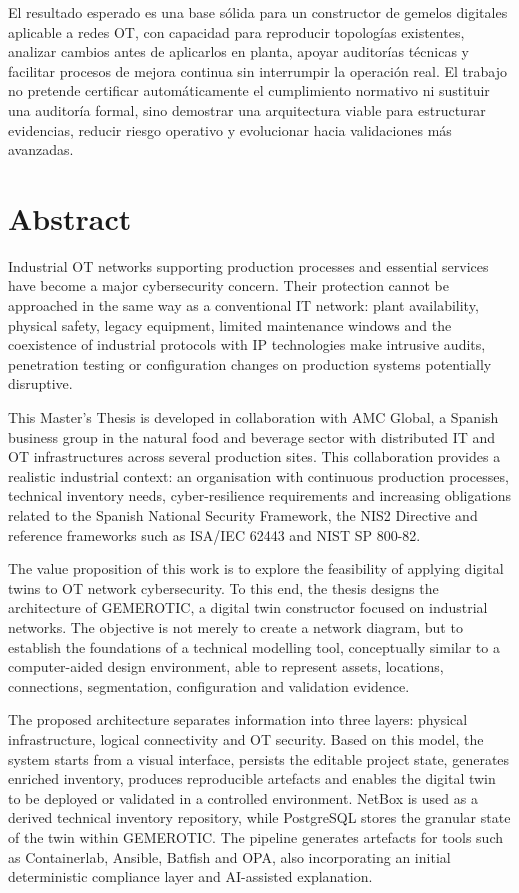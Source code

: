 El resultado esperado es una base sólida para un constructor de gemelos digitales aplicable a redes OT, con capacidad para reproducir topologías existentes, analizar cambios antes de aplicarlos en planta, apoyar auditorías técnicas y facilitar procesos de mejora continua sin interrumpir la operación real. El trabajo no pretende certificar automáticamente el cumplimiento normativo ni sustituir una auditoría formal, sino demostrar una arquitectura viable para estructurar evidencias, reducir riesgo operativo y evolucionar hacia validaciones más avanzadas.

\chapter*{Abstract}

Industrial OT networks supporting production processes and essential services have become a major cybersecurity concern. Their protection cannot be approached in the same way as a conventional IT network: plant availability, physical safety, legacy equipment, limited maintenance windows and the coexistence of industrial protocols with IP technologies make intrusive audits, penetration testing or configuration changes on production systems potentially disruptive.

This Master's Thesis is developed in collaboration with AMC Global, a Spanish business group in the natural food and beverage sector with distributed IT and OT infrastructures across several production sites. This collaboration provides a realistic industrial context: an organisation with continuous production processes, technical inventory needs, cyber-resilience requirements and increasing obligations related to the Spanish National Security Framework, the NIS2 Directive and reference frameworks such as ISA/IEC 62443 and NIST SP 800-82.

The value proposition of this work is to explore the feasibility of applying digital twins to OT network cybersecurity. To this end, the thesis designs the architecture of GEMEROTIC, a digital twin constructor focused on industrial networks. The objective is not merely to create a network diagram, but to establish the foundations of a technical modelling tool, conceptually similar to a computer-aided design environment, able to represent assets, locations, connections, segmentation, configuration and validation evidence.

The proposed architecture separates information into three layers: physical infrastructure, logical connectivity and OT security. Based on this model, the system starts from a visual interface, persists the editable project state, generates enriched inventory, produces reproducible artefacts and enables the digital twin to be deployed or validated in a controlled environment. NetBox is used as a derived technical inventory repository, while PostgreSQL stores the granular state of the twin within GEMEROTIC. The pipeline generates artefacts for tools such as Containerlab, Ansible, Batfish and OPA, also incorporating an initial deterministic compliance layer and AI-assisted explanation.

